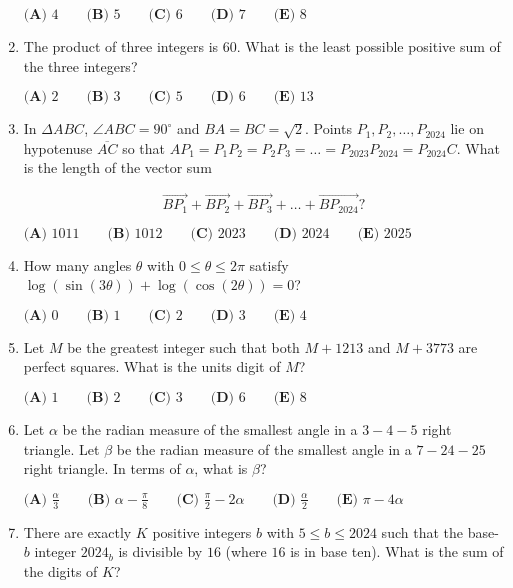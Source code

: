 \documentclass{article}
\begin{document}
\begin{enumerate}[label=\arabic*., itemsep=0.5em]
$\textbf{(A) }4\qquad\textbf{(B) }5\qquad\textbf{(C) }6\qquad\textbf{(D) }7\qquad\textbf{(E) }8$\par \vspace{0.5em}\item The product of three integers is $60$. What is the least possible positive sum of the three integers?

$\textbf{(A) } 2 \qquad \textbf{(B) } 3 \qquad \textbf{(C) } 5 \qquad \textbf{(D) } 6 \qquad \textbf{(E) } 13$\par \vspace{0.5em}\item In $\Delta ABC$, $\angle ABC = 90^\circ$ and $BA = BC = \sqrt{2}$. Points $P_1, P_2, \dots, P_{2024}$ lie on hypotenuse $\overline{AC}$ so that $AP_1= P_1P_2 = P_2P_3 = \dots = P_{2023}P_{2024} = P_{2024}C$. What is the length of the vector sum

\begin{equation*}
\overrightarrow{BP_1} + \overrightarrow{BP_2} + \overrightarrow{BP_3} + \dots + \overrightarrow{BP_{2024}}?
\end{equation*}

$
\textbf{(A) }1011 \qquad
\textbf{(B) }1012 \qquad
\textbf{(C) }2023 \qquad
\textbf{(D) }2024 \qquad
\textbf{(E) }2025 \qquad
$\par \vspace{0.5em}\item How many angles $\theta$ with $0\le\theta\le2\pi$ satisfy $\log(\sin(3\theta))+\log(\cos(2\theta))=0$?  

$ \textbf{(A) }0 \qquad \textbf{(B) }1 \qquad \textbf{(C) }2 \qquad \textbf{(D) }3 \qquad \textbf{(E) }4 \qquad $\par \vspace{0.5em}\item Let $M$ be the greatest integer such that both $M + 1213$ and $M + 3773$ are perfect squares. What is the units digit of $M$?

$
\textbf{(A) }1 \qquad
\textbf{(B) }2 \qquad
\textbf{(C) }3 \qquad
\textbf{(D) }6 \qquad
\textbf{(E) }8 \qquad
$\par \vspace{0.5em}\item Let $\alpha$ be the radian measure of the smallest angle in a $3{-}4{-}5$ right triangle. Let $\beta$ be the radian measure of the smallest angle in a $7{-}24{-}25$ right triangle. In terms of $\alpha$, what is $\beta$?

$
\textbf{(A) }\frac{\alpha}{3}\qquad
\textbf{(B) }\alpha - \frac{\pi}{8}\qquad
\textbf{(C) }\frac{\pi}{2} - 2\alpha \qquad
\textbf{(D) }\frac{\alpha}{2}\qquad
\textbf{(E) }\pi - 4\alpha\qquad
$\par \vspace{0.5em}\item There are exactly $K$ positive integers $b$ with $5 \leq b \leq 2024$ such that the base-$b$ integer $2024_b$ is divisible by $16$ (where $16$ is in base ten). What is the sum of the digits of $K$?


\end{enumerate}
\end{document}
